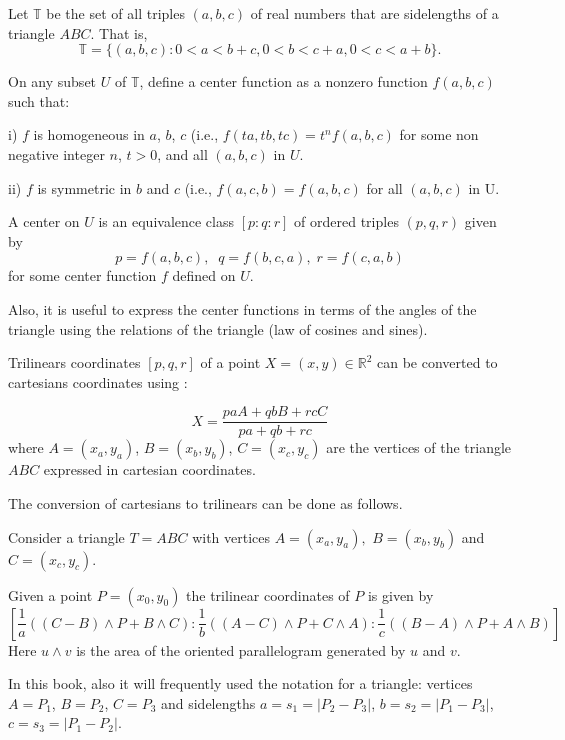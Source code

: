 Let $\mathbb{T}$ be the set of all triples $(a, b, c)$ of real numbers that are sidelengths of a triangle $ABC$. That is,
\[
\mathbb{T} = \{ (a, b, c): 0 <a< b + c, 0 <b < c +a, 0 < c < a+ b\}.\]

On any subset $U$ of $\mathbb{T}$, define a center  function as a nonzero function $f(a, b, c)$ such that:

\noindent i) $f$ is homogeneous in $a$, $b$, $c$ (i.e., $f(ta, tb, tc) = t^n f(a, b, c)$   for some non negative integer
$n$,  $t > 0$, and all $(a, b, c) $ in $U$.

\noindent ii) $f$ is  symmetric in $b$ and $c$ (i.e., $f(a, c, b)= f(a, b, c)$
for all $(a, b, c)$ in U. 


A center on $U$ is an equivalence class $[p:q:r]$ of ordered triples
$(p,q,r) $ given by
 \[p= f( a, b, c),\;\; q= f( b, c, a),\; r = f( c, a, b)\]
for some center function $f$ defined on $U$. 

\begin{remark}
 Also, it is useful to express the center functions in terms of the angles of the triangle using the relations of the triangle (law of cosines and sines).
\end{remark}
 
Trilinears coordinates $[p,q,r]$  of a point $X=(x,y) \in \mathbb{R}^2$ can be  converted to cartesians coordinates using \cite{mw}:

\begin{equation}
\label{eqn:appAtrilin-cartesian}
X=\frac{p a A + q b B + r c C}{pa+qb+rc}
\end{equation}
where $A=(x_a,y_a)$, $B=(x_b,y_b)$, $C=(x_c,y_c)$ are the vertices of the triangle $ABC$ expressed in cartesian coordinates.

The conversion of cartesians  to trilinears can be done as follows.

Consider a triangle $T=ABC$ with vertices $A=(x_a,y_a),$ $B=(x_b,y_b)$ and $C=(x_c,y_c)$.

Given a point $P=(x_0,y_0)$ the trilinear coordinates of $P$
is given by
{\small 
\[ \left[ \frac{1}{a}( (C-B)\wedge P+B\wedge C): \frac{1}{b}( (A-C)\wedge P+C\wedge A): \frac{1}{c}( (B-A)\wedge P+A\wedge B)\right] \]}
Here $u\wedge v$ is the area of the oriented parallelogram generated by $u$ and $v$.

\begin{remark}
In this book, also it will  frequently used the notation for a triangle: vertices $A=P_1$, $B=P_2$, $C=P_3$ and sidelengths $a=s_1=|P_2-P_3|$, $b=s_2=|P_1-P_3|$,
$c=s_3=|P_1-P_2|$.
\end{remark}

